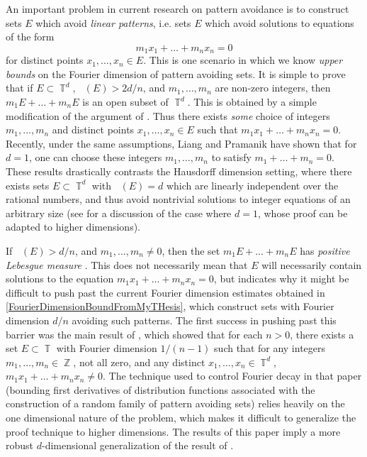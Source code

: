 \documentclass[dvipsnames,letterpaper,12pt]{article}
\numberwithin{equation}{section}
\DeclareMathOperator{\hausdim}{\dim_{\mathbb{H}}}
\DeclareMathOperator{\fordim}{\dim_{\mathbb{F}}}
\DeclareMathOperator{\ZZ}{\mathbb{Z}}
\DeclareMathOperator{\TT}{\mathbb{T}}
\numberwithin{theorem}{section}
\begin{document}
An important problem in current research on pattern avoidance is to construct sets $E$ which avoid \emph{linear patterns}, i.e. sets $E$ which avoid solutions to equations of the form
%
\begin{equation}
    m_1x_1 + \dots + m_nx_n = 0
\end{equation}
%
for distinct points $x_1,\dots,x_n \in E$.
%
%
This is one scenario in which we know \emph{upper bounds} on the Fourier dimension of pattern avoiding sets. It is simple to prove that if $E \subset \TT^d$, $\fordim(E) > 2d/n$, and $m_1,\dots,m_n$ are non-zero integers, then $m_1 E + \dots + m_n E$ is an open subset of $\TT^d$. This is obtained by a simple modification of the argument of \cite[Proposition 3.14]{MattilaFourier}. Thus there exists \emph{some} choice of integers $m_1,\dots,m_n$ and distinct points $x_1,\dots,x_n \in E$ such that $m_1x_1 + \dots + m_nx_n = 0$. Recently, under the same assumptions, Liang and Pramanik \cite{LiangPramanik} have shown that for $d = 1$, one can choose these integers $m_1,\dots,m_n$ to satisfy $m_1 + \dots + m_n = 0$. These results drastically contrasts the Hausdorff dimension setting, where there exists sets $E \subset \TT^d$ with $\hausdim(E) = d$ which are linearly independent over the rational numbers, and thus avoid nontrivial solutions to integer equations of an arbitrary size (see \cite{Keleti} for a discussion of the case where $d = 1$, whose proof can be adapted to higher dimensions).

If $\fordim(E) > d/n$, and $m_1,\dots,m_n \neq 0$, then the set $m_1 E + \dots + m_n E$ has \emph{positive Lebesgue measure} \cite[Proposition 3.14]{MattilaFourier}. This does not necessarily mean that $E$ will necessarily contain solutions to the equation $m_1x_1 + \dots + m_nx_n = 0$, but indicates why it might be difficult to  push past the current Fourier dimension estimates obtained in \eqref{FourierDimensionBoundFromMyTHesis}, which construct sets with Fourier dimension $d/n$ avoiding such patterns. The first success in pushing past this barrier was the main result of \cite{Korner2}, which showed that for each $n > 0$, there exists a set $E \subset \TT$ with Fourier dimension $1/(n-1)$ such that for any integers $m_1,\dots,m_n \in \ZZ$, not all zero, and any distinct $x_1,\dots,x_n \in \TT^d$, $m_1x_1 + \dots + m_nx_n \neq 0$. The technique used to control Fourier decay in that paper (bounding first derivatives of distribution functions associated with the construction of a random family of pattern avoiding sets) relies heavily on the one dimensional nature of the problem, which makes it difficult to generalize the proof technique to higher dimensions. The results of this paper imply a more robust $d$-dimensional generalization of the result of \cite{Korner2}.
\end{document}
